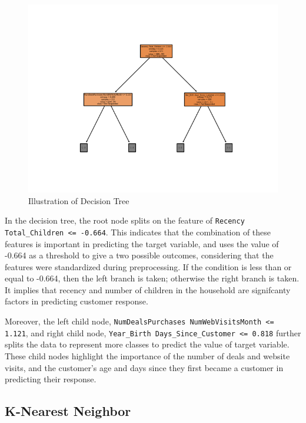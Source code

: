 \begin{figure}[H]
    \centering
    \includegraphics[width=\linewidth]{figures/decision_tree.png}
    \caption{Illustration of Decision Tree}
    \label{fig:tts cv}
\end{figure}

In the decision tree, the root node splits on the feature of \texttt{Recency Total\_Children <= -0.664}. This indicates that the combination of these features is important in predicting the target variable, and uses the value of -0.664 as a threshold to give a two possible outcomes, considering that the features were standardized during preprocessing. If the condition is less than or equal to -0.664, then the left branch is taken; otherwise the right branch is taken. It implies that recency and number of children in the household are signifcanty factors in predicting customer response. 

Moreover, the left child node, \texttt{NumDealsPurchases NumWebVisitsMonth <= 1.121}, and right child node, \texttt{Year\_Birth Days\_Since\_Customer <= 0.818} further splits the data to represent more classes to predict the value of target variable. These child nodes highlight the importance of the number of deals and website visits, and the customer's age and days since they first became a customer in predicting their response.

\subsection{K-Nearest Neighbor}

